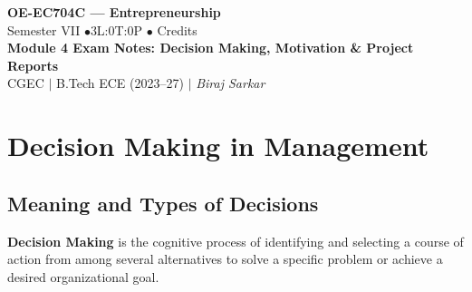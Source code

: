 \documentclass[12pt,a4paper]{article}
\begin{document}

\begin{center}
  {\LARGE\bfseries\color{myred} OE-EC704C --- Entrepreneurship}\\[5pt]
  {\normalsize\color{mydark} Semester VII \quad$\bullet$\quad 3L:0T:0P \quad$\bullet$ Credits}\\[3pt]
  {\normalsize\color{myteal}\textbf{Module 4 Exam Notes: Decision Making, Motivation \& Project Reports}}\\[3pt]
  {\small\color{mydark} CGEC \;$|$\; B.Tech ECE (2023--27) \;$|$\; \textit{Biraj Sarkar}}
\end{center}
\vspace{2pt}
\noindent{\color{myred}\rule{\linewidth}{1.5pt}}
\vspace{2pt}

\hypersetup{linkcolor=mydark}
\tableofcontents
\hypersetup{linkcolor=myteal}
\newpage

\section{Decision Making in Management}

\subsection{Meaning and Types of Decisions}
\begin{tcolorbox}[defbox, title={Definition of Decision Making}]
\textbf{Decision Making} is the cognitive process of identifying and selecting a course of action from among several alternatives to solve a specific problem or achieve a desired organizational goal.
\end{tcolorbox}
\end{document}
